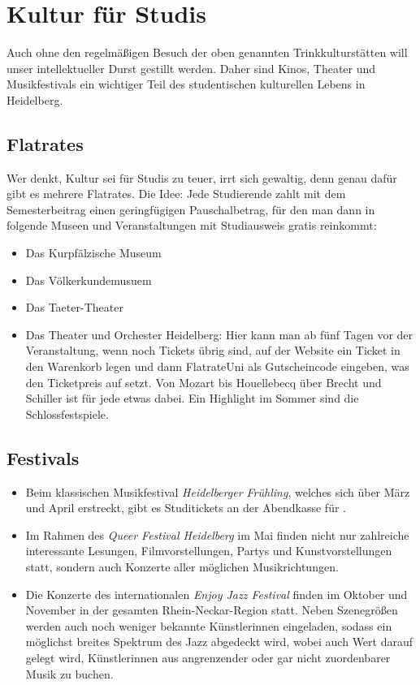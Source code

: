 
\section{Kultur für Studis}

Auch ohne den regelmäßigen Besuch der oben genannten Trinkkulturstätten will unser intellektueller Durst gestillt werden. Daher sind Kinos, Theater und Musikfestivals ein wichtiger Teil des studentischen kulturellen Lebens in Heidelberg.

\subsection{Flatrates}
Wer denkt, Kultur sei für Studis zu teuer, irrt sich gewaltig, denn genau dafür gibt es mehrere Flatrates. Die Idee: Jede Studierende zahlt mit dem Semesterbeitrag einen geringfügigen Pauschalbetrag, für den man dann in folgende Museen und Veranstaltungen mit Studiausweis gratis reinkommt:
\begin{itemize}
 \item Das Kurpfälzische Museum
 \item Das Völkerkundemusuem
 \item Das Taeter-Theater
 \item Das Theater und Orchester Heidelberg: Hier kann man ab fünf Tagen vor der Veranstaltung, wenn noch Tickets übrig sind, auf der Website ein Ticket in den Warenkorb legen und dann FlatrateUni als Gutscheincode eingeben, was den Ticketpreis auf  setzt. Von Mozart bis Houellebecq über Brecht und Schiller ist für jede etwas dabei. Ein Highlight im Sommer sind die Schlossfestspiele.
\end{itemize}

\subsection{Festivals}

\begin{itemize}
\item Beim klassischen Musikfestival \emph{Heidelberger Frühling}, welches sich über März und April erstreckt, gibt es Studitickets an der Abendkasse für .
\item Im Rahmen des \emph{Queer Festival Heidelberg} im Mai finden nicht nur zahlreiche interessante Lesungen, Filmvorstellungen, Partys und Kunstvorstellungen statt, sondern auch Konzerte aller möglichen Musikrichtungen.
\item Die Konzerte des internationalen \emph{Enjoy Jazz Festival} finden im Oktober und November in der gesamten Rhein-Neckar-Region statt. Neben Szenegrößen werden auch noch weniger bekannte Künstlerinnen eingeladen, sodass ein möglichst breites Spektrum des Jazz abgedeckt wird, wobei auch Wert darauf gelegt wird, Künstlerinnen aus angrenzender oder gar nicht zuordenbarer Musik zu buchen.
\end{itemize}


